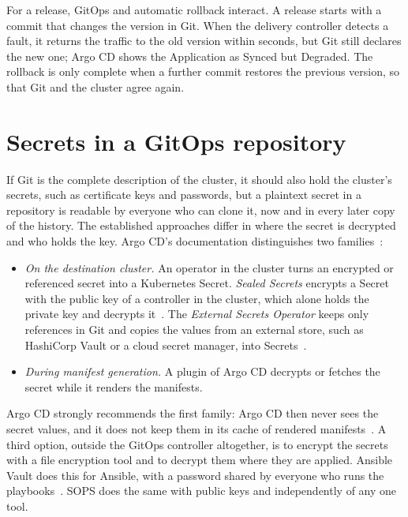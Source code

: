 For a release, GitOps and automatic rollback interact. A release starts with a commit that changes the version in Git. When the delivery controller detects a fault, it returns the traffic to the old version within seconds, but Git still declares the new one; Argo CD shows the Application as Synced but Degraded. The rollback is only complete when a further commit restores the previous version, so that Git and the cluster agree again.

\section{Secrets in a GitOps repository}
\label{sec:BgSecrets}
If Git is the complete description of the cluster, it should also hold the cluster's secrets, such as certificate keys and passwords, but a plaintext secret in a repository is readable by everyone who can clone it, now and in every later copy of the history. The established approaches differ in where the secret is decrypted and who holds the key. Argo CD's documentation distinguishes two families~\cite{ArgoCDSecrets}:
\begin{itemize}
	\item \emph{On the destination cluster.} An operator in the cluster turns an encrypted or referenced secret into a Kubernetes Secret. \emph{Sealed Secrets} encrypts a Secret with the public key of a controller in the cluster, which alone holds the private key and decrypts it~\cite{SealedSecrets}. The \emph{External Secrets Operator} keeps only references in Git and copies the values from an external store, such as HashiCorp Vault or a cloud secret manager, into Secrets~\cite{ExternalSecrets}.
	\item \emph{During manifest generation.} A plugin of Argo CD decrypts or fetches the secret while it renders the manifests.
\end{itemize}
Argo CD strongly recommends the first family: Argo CD then never sees the secret values, and it does not keep them in its cache of rendered manifests~\cite{ArgoCDSecrets}. A third option, outside the GitOps controller altogether, is to encrypt the secrets with a file encryption tool and to decrypt them where they are applied. Ansible Vault does this for Ansible, with a password shared by everyone who runs the playbooks~\cite{AnsibleVault}. SOPS does the same with public keys and independently of any one tool.


